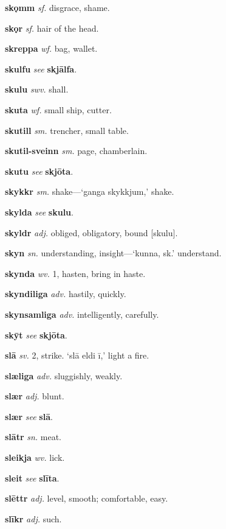 \documentclass[12pt,letterpaper]{book}
\begin{document}
\noindent
\textbf{skǫmm} \textit{sf.} disgrace, shame.

\noindent
\textbf{skǫr} \textit{sf.} hair of the head.

\noindent
\textbf{skreppa} \textit{wf.} bag, wallet.

\noindent
\textbf{skulfu} \textit{} \textit{see} \textbf{skjālfa}.

\noindent
\textbf{skulu} \textit{swv.} shall.

\noindent
\textbf{skuta} \textit{wf.} small ship, cutter.

\noindent
\textbf{skutill} \textit{sm.} trencher, small table.

\noindent
\textbf{skutil-sveinn} \textit{sm.} page, chamberlain.

\noindent
\textbf{skutu} \textit{} \textit{see} \textbf{skjōta}.

\noindent
\textbf{skykkr} \textit{sm.} shake---`ganga skykkjum,' shake.

\noindent
\textbf{skylda} \textit{} \textit{see} \textbf{skulu}.

\noindent
\textbf{skyldr} \textit{adj.} obliged, obligatory, bound [skulu].

\noindent
\textbf{skyn} \textit{sn.} understanding, insight---`kunna, sk.' understand.

\noindent
\textbf{skynda} \textit{wv.} 1, hasten, bring in haste.

\noindent
\textbf{skyndiliga} \textit{adv.} hastily, quickly.

\noindent
\textbf{skynsamliga} \textit{adv.} intelligently, carefully.

\noindent
\textbf{skȳt} \textit{} \textit{see} \textbf{skjōta}.

\noindent
\textbf{slā} \textit{sv.} 2, strike.  `slā eldi ī,' light a fire.

\noindent
\textbf{slæliga} \textit{adv.} sluggishly, weakly.

\noindent
\textbf{slær} \textit{adj.} blunt.

\noindent
\textbf{slær} \textit{} \textit{see} \textbf{slā}.

\noindent
\textbf{slātr} \textit{sn.} meat.

\noindent
\textbf{sleikja} \textit{wv.} lick.

\noindent
\textbf{sleit} \textit{} \textit{see} \textbf{slīta}.

\noindent
\textbf{slēttr} \textit{adj.} level, smooth; comfortable, easy.

\noindent
\textbf{slīkr} \textit{adj.} such.
\end{document}
